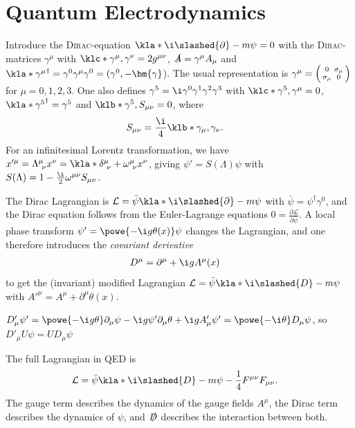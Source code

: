 \documentclass[english, parskip=full]{scrbook}
\newcommand{\note}[1]{\begin{tcolorbox}[colback=colorbackgroundnote,colframe=colornote, breakable,enhanced]#1\end{tcolorbox}}
\begin{document}
\section{Quantum Electrodynamics}
Introduce the \textsc{Dirac}-equation $\kla*{\i \slashed{\partial} - m}\psi=0$ with the  \textsc{Dirac}-matrices $\gamma^\mu$ with $\klc*{\gamma^\mu,\gamma^\nu } = 2g^{\mu\nu}$, $\slashed{A} = \gamma^\mu A_\mu$ and $\kla*{\gamma^\mu }^\dagger = \gamma^0 \gamma^\mu \gamma^0 = (\gamma^0, -\bm{\gamma}$).
The usual representation is $\gamma^\mu = \begin{psmallmatrix} 0 & \sigma_\mu \\ \sigma_\mu & 0 \end{psmallmatrix}$ for $\mu=0,1,2,3$.
One also defines $\gamma^5=\i\gamma^0\gamma^1\gamma^2\gamma^3$ with $\klc*{\gamma^5,\gamma^\mu }=0$, $\kla*{\gamma^5}^\dagger = \gamma^5$ and $\klb*{\gamma^5, S_{\mu\nu}}=0$, where
\begin{align}
S_{\mu\nu} &= \frac{\i}{4} \klb*{\gamma_\mu,\gamma_\nu }.
\end{align}
For an infinitesimal Lorentz transformation, we have $x'^\mu = \Lambda^\mu_{\ \nu} x^\nu = \kla*{\delta^\mu_{\ \nu} + \omega^\mu_{\ \nu}}x^\nu$, giving $\psi'=S(\Lambda)\psi$ with $S(\Lambda) = 1 - \frac{\i}{2} \omega^{\mu\nu} S_{\mu\nu}$.

The Dirac Lagrangian is $\mathcal{L} = \bar{\psi} \kla*{\i\slashed{\partial} - m}\psi$ with $\bar{\psi} = \psi^\dagger \gamma^0$, and the Dirac equation follows from the Euler-Lagrange equations $0=\frac{\partial\mathcal{L}}{\partial\bar{\psi}}$.
A local phase transform $\psi'=\powe{-\i g\theta(x)}\psi$ changes the Lagrangian, and one therefore introduces the \emph{covariant derivative}
\begin{align}
D^\mu &= \partial^\mu + \i g A^\mu(x)
\end{align}
to get the (invariant) modified Lagrangian $\mathcal{L} = \bar{\psi} \kla*{\i\slashed{D} - m}\psi$ with $A'^\mu=A^\mu + \partial^\mu \theta(x)$.
\note{$D'_\mu\psi' = \powe{-\i g\theta} \partial_\mu \psi - \i g\psi' \partial_\mu \theta + \i g A'_\mu \psi' = \powe{-\i \theta} D_\mu\psi$, so $D'_\mu U\psi = UD_\mu \psi$}
The full Lagrangian in QED is
\begin{align}
\mathcal{L} &= \bar{\psi} \kla*{\i\slashed{D} - m}\psi - \frac{1}{4} F^{\mu\nu}F_{\mu\nu}.
\end{align}
The gauge term describes the dynamics of the gauge fields $A^\mu$, the Dirac term describes the dynamics of $\psi$, and $\slashed{D}$ describes the interaction between both.
\end{document}
